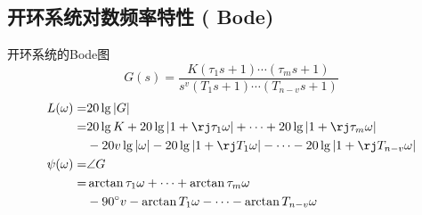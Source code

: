 \documentclass[handout,cjkutf8,table,aspectratio=1610]{beamer} %
\begin{document}
\subsection{开环系统对数频率特性 ( Bode)}
\begin{frame}{开环系统的Bode图}
	$$G(s) = \frac{K(\tau_1 s + 1)\cdots(\tau_m s + 1)}{s^v(T_1 s + 1)\cdots(T_{n-v}s + 1)}$$
	\begin{align*}
		L(\omega) =& 20\lg |G|\\
				=& 20\lg K + 20 \lg |1+\rj\tau_1\omega| + \cdots + 20\lg |1 + \rj\tau_m\omega|\\
				&-20v\lg | \omega | - 20\lg | 1 + \rj T_1\omega | - \cdots - 20\lg | 1+ \rj T_{n-v}\omega |\\
		\psi(\omega) =& \angle G\\
				=& \arctan \tau_1\omega + \cdots + \arctan \tau_m\omega\\
				& -90^\circ v - \arctan T_1\omega - \cdots - \arctan T_{n-v}\omega
	\end{align*}
\end{frame}
\end{document}
